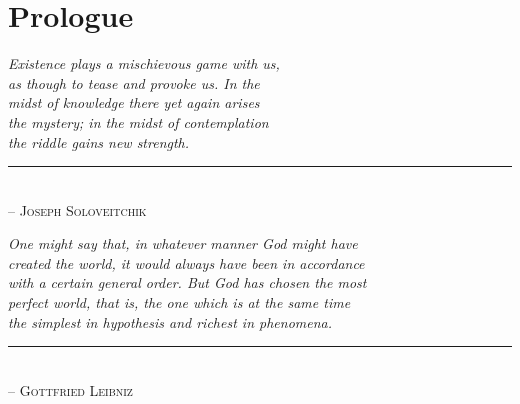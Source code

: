 \chapter*{Prologue}


\begin{flushleft}
	\textsl{Existence plays a mischievous game with us,}\\
	\textsl{as though to tease and provoke us. In the }\\
	\textsl{midst of knowledge there yet again arises }\\
	\textsl{the mystery; in the midst of contemplation}\\
	\textsl{the riddle gains new strength.}\\
	\rule[0pt]{19.5em}{0.5pt}\\
	-- \textsc{Joseph Soloveitchik}\\
	\vspace{2em}
\end{flushleft}

\begin{flushleft}
	\textsl{One might say that, in whatever manner God might have}\\
	\textsl{created the world, it would always have been in accordance}\\
	\textsl{with a certain general order. But God has chosen the most}\\
	\textsl{perfect world, that is, the one which is at the same time}\\
	\textsl{the simplest in hypothesis and richest in phenomena.}\\
	\rule[0pt]{26em}{0.5pt}\\
	-- \textsc{Gottfried Leibniz}\\
	\vspace{2em}
\end{flushleft}


